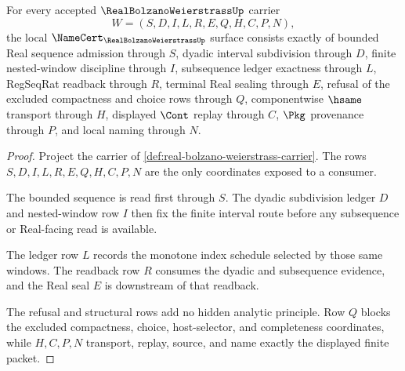\begin{theorem}
\label{thm:real-bolzano-weierstrass-namecert-obligations}
For every accepted $\RealBolzanoWeierstrassUp$ carrier
$$
W=(S,D,I,L,R,E,Q,H,C,P,N),
$$
the local $\NameCert_{\RealBolzanoWeierstrassUp}$ surface consists exactly of bounded Real sequence admission through $S$, dyadic interval subdivision through $D$, finite nested-window discipline through $I$, subsequence ledger exactness through $L$, RegSeqRat readback through $R$, terminal Real sealing through $E$, refusal of the excluded compactness and choice rows through $Q$, componentwise $\hsame$ transport through $H$, displayed $\Cont$ replay through $C$, $\Pkg$ provenance through $P$, and local naming through $N$.
\end{theorem}
\begin{proof}
Project the carrier of \autoref{def:real-bolzano-weierstrass-carrier}. The rows $S,D,I,L,R,E,Q,H,C,P,N$ are the only coordinates exposed to a consumer.

The bounded sequence is read first through $S$. The dyadic subdivision ledger $D$ and nested-window row $I$ then fix the finite interval route before any subsequence or Real-facing read is available.

The ledger row $L$ records the monotone index schedule selected by those same windows. The readback row $R$ consumes the dyadic and subsequence evidence, and the Real seal $E$ is downstream of that readback.

The refusal and structural rows add no hidden analytic principle. Row $Q$ blocks the excluded compactness, choice, host-selector, and completeness coordinates, while $H,C,P,N$ transport, replay, source, and name exactly the displayed finite packet.
\end{proof}

